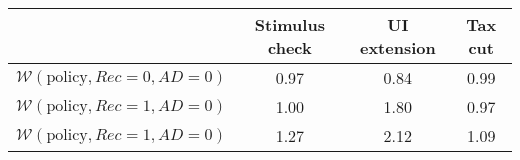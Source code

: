 \begin{tabular}{@{}lccc@{}} 
\toprule 
                          & Stimulus check      & UI extension    & Tax cut    \\  \midrule 
$\mathcal{W}(\text{policy}, Rec=0, AD=0)$ & 0.97  & 0.84  & 0.99     \\ 
$\mathcal{W}(\text{policy}, Rec=1, AD=0)$ & 1.00  & 1.80  & 0.97     \\ 
$\mathcal{W}(\text{policy}, Rec=1, AD=0)$ & 1.27  & 2.12  & 1.09     \\ 
\end{tabular}  
